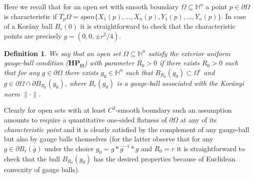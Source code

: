 \documentclass[10pt]{amsart}
\numberwithin{equation}{section}
\newtheorem{definition}[theorem]{Definition}
\theoremstyle{definition}
\newcommand{\He}{\mathbb{H}}
\begin{document}
Here we recall that for an open set with smooth boundary $\Omega \subseteq \mathbb{H}^n$ a point $p \in \partial \Omega$ is characteristic if $T_p \Omega=span \{ X_1(p) , \ldots, X_n(p) , Y_1(p), \ldots, Y_n(p)\}$. In case of a 
 Kor\'{a}ny ball $B_r(0)$ it is straightforward to check that the characteristic points are precisely $g=(0,0,\pm r^2/4)$. 
  
\begin{definition}
\label{exterior-condition}
We say that an open set $\Omega \subseteq \He^n$ satisfy the exterior uniform gauge-ball condition ($\mathbf{HP_\Omega}$) with parameter $R_0>0$ if  there exists  $R_0>0$ such that for any $g \in \partial \Omega$ there exists $g_0\in \He^n$ such that $B_{R_0}(g_0) \subset \Omega^{c}$ and $g \in \partial \Omega \cap \partial B_{R_0}(g_0)$, where $B_r(g_0)$ is a gauge-ball associated with the Kor\'anyi norm $\| \cdot \|$.
\end{definition}
Clearly for open sets with at least $C^2$-smooth boundary such an assumption amounts to require a quantitative one-sided flatness of $\partial \Omega$ at any of its {\em characteristic point} and it is clearly satisfied by the complement of any gauge-ball but also by gauge balls themselves (for the latter observe that for any $g \in \partial B_r(\bar{g})$ under the choice $g_0= g*{\bar{g}}^{-1}*g$ and $R_0=r$ it is straightforward to check that the ball $B_{R_0}(g_0)$ has the desired properties because of Euclidean convexity of gauge balls).
\end{document}

